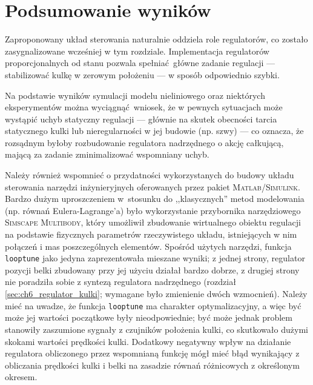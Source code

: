 
\section{Podsumowanie wyników}

Zaproponowany układ sterowania naturalnie oddziela role regulatorów, co zostało zasygnalizowane wcześniej w tym rozdziale. Implementacja regulatorów proporcjonalnych od stanu pozwala spełniać główne zadanie regulacji --- stabilizować kulkę w zerowym położeniu --- w sposób odpowiednio szybki.

Na podstawie wyników symulacji modelu nieliniowego oraz niektórych eksperymentów można wyciągnąć wniosek, że w pewnych sytuacjach może wystąpić uchyb statyczny regulacji --- głównie na skutek obecności tarcia statycznego kulki lub nieregularności w jej budowie (np. szwy) --- co oznacza, że rozsądnym byłoby rozbudowanie regulatora nadrzędnego o akcję całkującą, mającą za zadanie zminimalizować wspomniany uchyb.

Należy również wspomnieć o przydatności wykorzystanych do budowy układu sterowania narzędzi inżynieryjnych oferowanych przez pakiet \textsc{Matlab/Simulink}. Bardzo dużym uproszczeniem w~stosunku do ,,klasycznych'' metod modelowania (np. równań Eulera-Lagrange'a) było wykorzystanie przybornika narzędziowego \textsc{Simscape Multibody}, który umożliwił zbudowanie wirtualnego obiektu regulacji na podstawie fizycznych parametrów rzeczywistego układu, istniejących w nim połączeń i mas poszczególnych elementów. Spośród użytych narzędzi, funkcja \texttt{looptune} jako jedyna zaprezentowała mieszane wyniki; z jednej strony, regulator pozycji belki zbudowany przy jej użyciu działał bardzo dobrze, z drugiej strony nie poradziła sobie z syntezą regulatora nadrzędnego (rozdział \ref{sec:ch6_regulator_kulki}; wymagane było zmienienie dwóch wzmocnień). Należy mieć na uwadze, że funkcja \texttt{looptune} ma charakter optymalizacyjny, a więc być może jej wartości początkowe były nieodpowiednie; być może jednak problem stanowiły zaszumione sygnały z czujników położenia kulki, co skutkowało dużymi skokami wartości prędkości kulki. Dodatkowy negatywny wpływ na działanie regulatora obliczonego przez wspomnianą funkcję mógł mieć błąd wynikający z obliczania prędkości kulki i belki na zasadzie równań różnicowych z określonym okresem.


